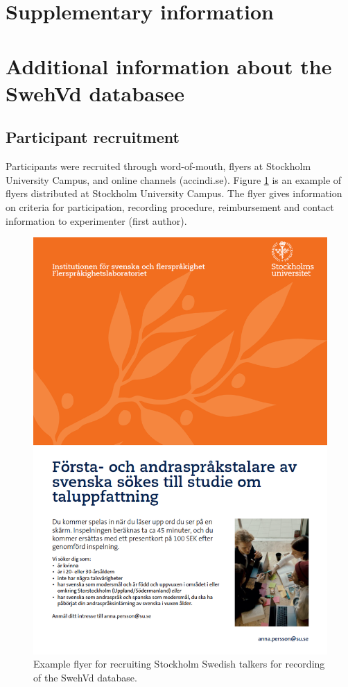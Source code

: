 \documentclass[utf8]{frontiersSCNS}
\begin{document}
\endgroup

\newpage
\setcounter{page}{1}
\renewcommand{\thesection}{\S \arabic{section}}
\renewcommand{\theHsection}{sisection. \arabic{section}}

\hypertarget{supplementary-information}{%
\section*{Supplementary information}\label{supplementary-information}}

\setcounter{section}{0}

\hypertarget{additional-information-about-the-swehvd-databasee}{%
\section{Additional information about the SwehVd databasee}\label{additional-information-about-the-swehvd-databasee}}

\hypertarget{sec:recruitment}{%
\subsection*{Participant recruitment}\label{sec:recruitment}}

Participants were recruited through word-of-mouth, flyers at Stockholm University Campus, and online channels (accindi.se). Figure \ref{fig:flyer} is an example of flyers distributed at Stockholm University Campus. The flyer gives information on criteria for participation, recording procedure, reimbursement and contact information to experimenter (first author).



\begin{figure}
\includegraphics[width=0.65\linewidth]{ad_recruitment} \caption{Example flyer for recruiting Stockholm Swedish talkers for recording of the SwehVd database.}\label{fig:flyer}
\end{figure}
\end{document}
